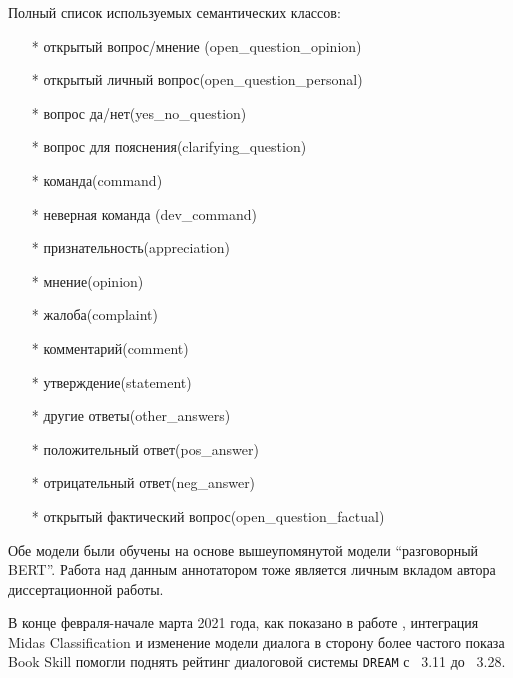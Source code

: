 Полный список используемых семантических классов:
\begin{itemize}
\item[*] открытый вопрос/мнение (open\_question\_opinion)
\item[*] открытый личный вопрос(open\_question\_personal)
\item[*] вопрос да/нет(yes\_no\_question)
\item[*] вопрос для пояснения(clarifying\_question)
\item[*] команда(command)
\item[*] неверная команда (dev\_command)
\item[*] признательность(appreciation)
\item[*] мнение(opinion)
\item[*] жалоба(complaint)
\item[*] комментарий(comment)
\item[*] утверждение(statement)
\item[*] другие ответы(other\_answers)
\item[*] положительный ответ(pos\_answer)
\item[*] отрицательный ответ(neg\_answer)
\item[*] открытый фактический вопрос(open\_question\_factual)
\end{itemize}
Обе модели были обучены на основе вышеупомянутой модели “разговорный BERT”.  Работа над данным аннотатором тоже является личным вкладом автора диссертационной работы. 

В конце февраля-начале марта 2021 года, как показано  в работе \cite{dream2}, интеграция Midas Classification и изменение модели диалога в сторону более частого показа Book Skill помогли поднять рейтинг диалоговой системы \texttt{DREAM} с ~3.11 до ~3.28.



